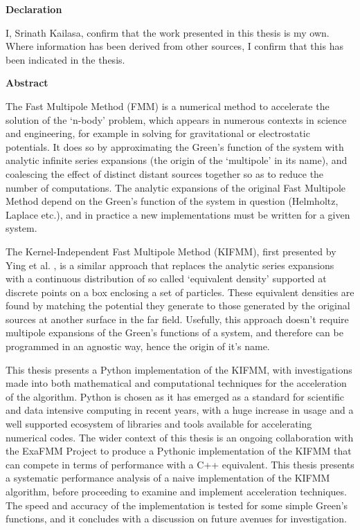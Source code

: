 \thispagestyle{plain}

\begin{center}
    \textbf{Declaration}
\end{center}
I, Srinath Kailasa, confirm that the work presented in this thesis is my own. Where information has been derived from other
sources, I confirm that this has been indicated in the thesis.

\begin{center}
    \textbf{Abstract}
\end{center}

The Fast Multipole Method (FMM) is a numerical method to accelerate the solution
of the `n-body' problem, which appears in numerous contexts in science and engineering,
for example in solving for gravitational or electrostatic potentials. It does so by approximating
the Green's function of the
system with analytic infinite series expansions (the origin of the `multipole' in its name),
 and coalescing the effect of distinct distant sources together so as to
reduce the number of computations. The analytic expansions of the
original Fast Multipole Method depend on the Green's function of the system in
question (Helmholtz, Laplace etc.), and in practice a new implementations
must be written for a given system.

The Kernel-Independent Fast Multipole Method (KIFMM),
first presented by Ying et al. \cite{ying}, is a similar approach that replaces
the analytic series expansions with a continuous distribution of so called
`equivalent density' supported at discrete points on a box enclosing a set of
particles. These equivalent densities are found by matching the potential they
generate to those generated by the original sources at another surface in the
far field. Usefully, this approach doesn't require multipole expansions of the
Green's functions of a system, and therefore can be programmed in an agnostic way,
hence the origin of it's name.

This thesis presents a Python implementation of
the KIFMM, with investigations made into both mathematical and computational
techniques for the acceleration of the algorithm. Python is chosen as it has emerged as a standard
for scientific and data intensive computing in recent years, with a huge increase
in usage and a well supported ecosystem of libraries and tools available for
accelerating numerical codes. The wider context of this thesis
is an ongoing collaboration with the ExaFMM Project \cite{exafmm} to produce a Pythonic
implementation of the KIFMM that can compete in terms of performance with
a C++ equivalent. This thesis presents a systematic performance analysis
of a naive implementation of the KIFMM algorithm, before proceeding to examine and implement
acceleration techniques. The speed and accuracy of the implementation is tested
for some simple Green's functions, and it concludes with a discussion on future avenues
for investigation.